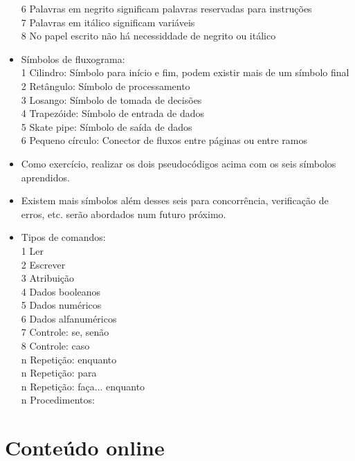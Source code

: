 \documentclass[12pt,a4paper]{article} %
\begin{document}
\begin{itemize}
6 Palavras em negrito significam palavras reservadas para instruções\\
7 Palavras em itálico significam variáveis\\
8 No papel escrito não há necessiddade de negrito ou itálico
\item Símbolos de fluxograma:\\
1 Cilindro: Símbolo para início e fim, podem existir mais de um símbolo final\\
2 Retângulo: Símbolo de processamento\\
3 Losango: Símbolo de tomada de decisões\\
4 Trapezóide: Símbolo de entrada de dados\\
5 Skate pipe: Símbolo de saída de dados\\
6 Pequeno círculo: Conector de fluxos entre páginas ou entre ramos\\
\item Como exercício, realizar os dois pseudocódigos acima com os seis símbolos aprendidos.
\item Existem mais símbolos além desses seis para concorrência, verificação de erros, etc. serão abordados num futuro próximo.
\item Tipos de comandos:\\
1 Ler\\
2 Escrever\\
3 Atribuição\\
4 Dados booleanos\\
5 Dados numéricos\\
6 Dados alfanuméricos\\
7 Controle: se, senão\\
8 Controle: caso\\
n Repetição: enquanto\\
n Repetição: para\\
n Repetição: faça... enquanto\\
n Procedimentos:\\
\end{itemize}

\section{Conteúdo online}
\end{document}

